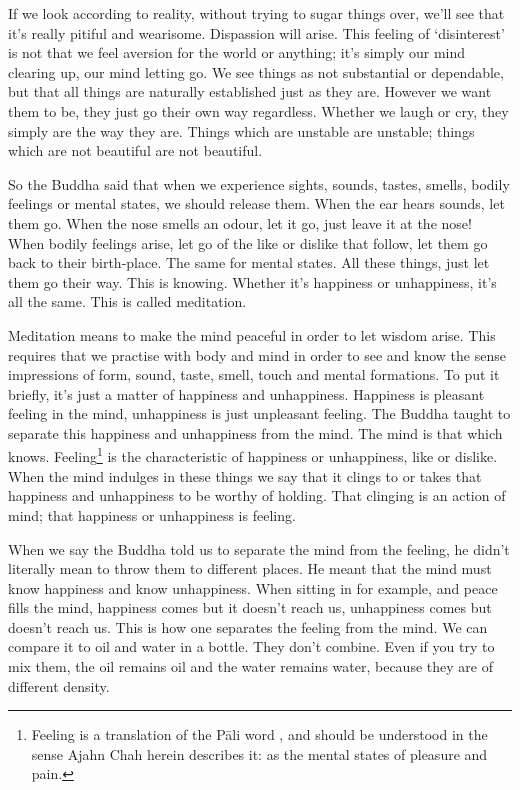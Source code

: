 If we look according to reality, without trying to sugar things over, we'll see that it's really pitiful and wearisome. Dispassion will arise. This feeling of `disinterest' is not that we feel aversion for the world or anything; it's simply our mind clearing up, our mind letting go. We see things as not substantial or dependable, but that all things are naturally established just as they are. However we want them to be, they just go their own way regardless. Whether we laugh or cry, they simply are the way they are. Things which are unstable are unstable; things which are not beautiful are not beautiful. 

So the Buddha said that when we experience sights, sounds, tastes, smells, bodily feelings or mental states, we should release them. When the ear hears sounds, let them go. When the nose smells an odour, let it go, just leave it at the nose! When bodily feelings arise, let go of the like or dislike that follow, let them go back to their birth-place. The same for mental states. All these things, just let them go their way. This is knowing. Whether it's happiness or unhappiness, it's all the same. This is called meditation. 

Meditation means to make the mind peaceful in order to let wisdom arise. This requires that we practise with body and mind in order to see and know the sense impressions of form, sound, taste, smell, touch and mental formations. To put it briefly, it's just a matter of happiness and unhappiness. Happiness is pleasant feeling in the mind, unhappiness is just unpleasant feeling. The Buddha taught to separate this happiness and unhappiness from the mind. The mind is that which knows. Feeling\footnote{Feeling is a translation of the P\=ali word , and should be understood in the sense Ajahn Chah herein describes it: as the mental states of pleasure and pain.} is the characteristic of happiness or unhappiness, like or dislike. When the mind indulges in these things we say that it clings to or takes that happiness and unhappiness to be worthy of holding. That clinging is an action of mind; that happiness or unhappiness is feeling. 

When we say the Buddha told us to separate the mind from the feeling, he didn't literally mean to throw them to different places. He meant that the mind must know happiness and know unhappiness. When sitting in  for example, and peace fills the mind, happiness comes but it doesn't reach us, unhappiness comes but doesn't reach us. This is how one separates the feeling from the mind. We can compare it to oil and water in a bottle. They don't combine. Even if you try to mix them, the oil remains oil and the water remains water, because they are of different density. 


